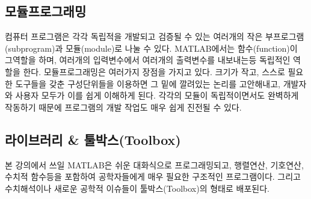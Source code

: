 \subsection{모듈프로그래밍}

컴퓨터 프로그램은 각각 독립적을 개발되고 검증될 수 있는 여러개의 작은 부프로그램(subprogram)과 모듈(module)로 나눌 수 있다. MATLAB에서는 함수(function)이 그역할을 하며, 여러개의 입력변수에서 여러개의 출력변수를 내보내는등 독립적인 역할을 한다.
모듈프로그래밍은 여러가지 장점을 가지고 있다. 크기가 작고, 스스로 필요한 도구들을 갖춘 구성단위들을 이용하면 그 밑에 깔려있는 논리를 고안해내고, 개발자와 사용자 모두가 이를 쉽게 이해하게 된다. 각각의 모듈이 독립적이면서도 완벽하게 작동하기 때문에 프로그램의 개발 작업도 매우 쉽게 진전될 수 있다.

\subsection{라이브러리 \& 툴박스(Toolbox)}
본 강의에서 쓰일 MATLAB은 쉬운 대화식으로 프로그래밍되고, 행렬연산, 기호연산, 수치적 함수등을 포함하여 공학자들에게 매우 필요한 구조적인 프로그램이다. 그리고 수치해석이나 새로운 공학적 이슈들이 툴박스(Toolbox)의 형태로 배포된다.




